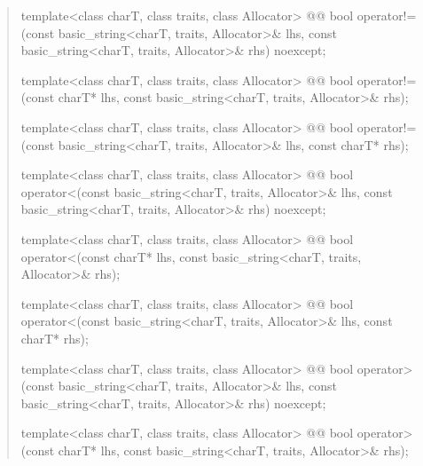 \documentclass{wg21}
\begin{document}
\begin{quote}
\begin{itemdecl}
template<class charT, class traits, class Allocator>
  @@
  bool operator!=(const basic_string<charT, traits, Allocator>& lhs,
                  const basic_string<charT, traits, Allocator>& rhs) noexcept;
\end{itemdecl}

\begin{itemdecl}
template<class charT, class traits, class Allocator>
  @@
  bool operator!=(const charT* lhs, const basic_string<charT, traits, Allocator>& rhs);
\end{itemdecl}

\begin{itemdecl}
template<class charT, class traits, class Allocator>
  @@
  bool operator!=(const basic_string<charT, traits, Allocator>& lhs, const charT* rhs);
\end{itemdecl}

\begin{itemdecl}
template<class charT, class traits, class Allocator>
  @@
  bool operator<(const basic_string<charT, traits, Allocator>& lhs,
                 const basic_string<charT, traits, Allocator>& rhs) noexcept;
\end{itemdecl}

\begin{itemdecl}
template<class charT, class traits, class Allocator>
  @@
  bool operator<(const charT* lhs, const basic_string<charT, traits, Allocator>& rhs);
\end{itemdecl}

\begin{itemdecl}
template<class charT, class traits, class Allocator>
  @@
  bool operator<(const basic_string<charT, traits, Allocator>& lhs, const charT* rhs);
\end{itemdecl}

\begin{itemdecl}
template<class charT, class traits, class Allocator>
  @@
  bool operator>(const basic_string<charT, traits, Allocator>& lhs,
                 const basic_string<charT, traits, Allocator>& rhs) noexcept;
\end{itemdecl}

\begin{itemdecl}
template<class charT, class traits, class Allocator>
  @@
  bool operator>(const charT* lhs, const basic_string<charT, traits, Allocator>& rhs);
\end{itemdecl}


\end{quote}
\end{document}
